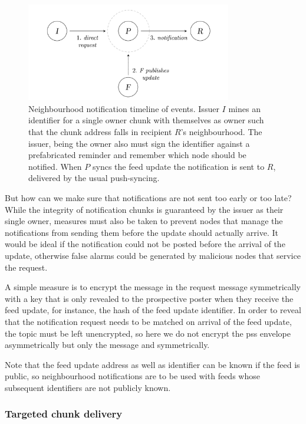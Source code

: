 \begin{figure}[htbp]
\centering
\includegraphics[width=0.8\textwidth]{fig/neighbourhood-notification-events.pdf}
\caption[Neighbourhood notification timeline of events \statusgreen]{Neighbourhood notification timeline of events. Issuer $I$ mines an identifier for a single owner chunk with themselves as owner such that the chunk address falls in recipient $R$'s neighbourhood. The issuer, being the owner also must sign the identifier against a prefabricated reminder and remember which node should be notified. When $P$ syncs the feed update the notification is sent to $R$, delivered by the usual push-syncing.}
\label{fig:neighbourhood-notification-events}
\end{figure}
  

But how can we make sure that notifications are not sent too early or too late? While the integrity of notification chunks is guaranteed by the issuer as their single owner, measures must also be taken to prevent nodes that manage the notifications from sending them before the update should actually arrive. It would be ideal if the notification could not be posted before the arrival of the update, otherwise false alarms could be generated by malicious nodes that service the request.

A simple measure is to encrypt the message in the request  message symmetrically with a key that is only revealed to the prospective poster when they receive the feed update, for instance, the hash of the feed update identifier.
In order to reveal that the notification request needs to be matched on arrival of the feed update, the topic must be left unencrypted, so here we do not encrypt the pss envelope asymmetrically but only the message and symmetrically.

Note that the feed update address as well as identifier can be known if the feed is public, so neighbourhood notifications are to be used with feeds whose subsequent identifiers are not publicly known.

\subsubsection{Targeted chunk delivery}

